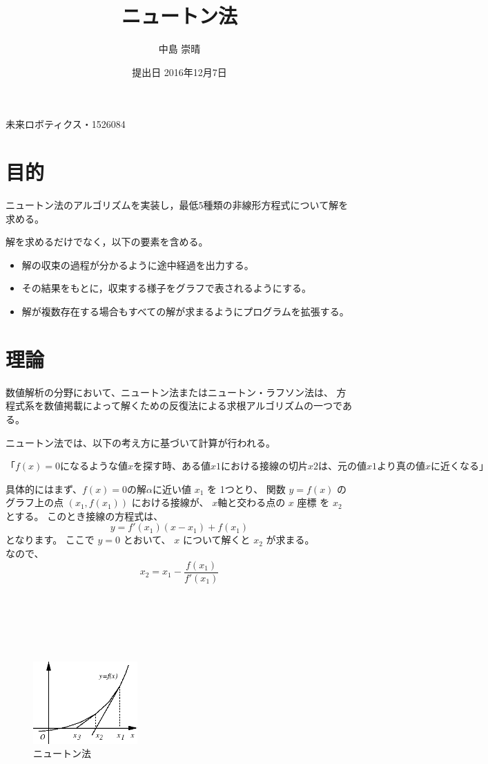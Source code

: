 \documentclass{jsarticle}
\begin{document}
\title{ニュートン法}
\author{中島 崇晴}
\date{提出日 2016年12月7日}
\maketitle
\begin{flushright}
    {\large 未来ロボティクス・1526084}\\
\end{flushright}

\section{目的}
ニュートン法のアルゴリズムを実装し，最低5種類の非線形方程式について解を求める。

解を求めるだけでなく，以下の要素を含める。
\begin{itemize}
    \item 解の収束の過程が分かるように途中経過を出力する。
    \item その結果をもとに，収束する様子をグラフで表されるようにする。
    \item 解が複数存在する場合もすべての解が求まるようにプログラムを拡張する。
\end{itemize}

\section{理論}
数値解析の分野において、ニュートン法またはニュートン・ラフソン法は、
方程式系を数値掲載によって解くための反復法による求根アルゴリズムの一つである。

ニュートン法では、以下の考え方に基づいて計算が行われる。

$「f(x) = 0になるような値xを探す時、ある値x1における接線の切片x2は、元の値x1より真の値xに近くなる」$

具体的にはまず、$f(x)=0$の解$\alpha$に近い値 $x_1$ を 1つとり、 関数 $y=f(x)$ のグラフ上の点  $(x_{1},f(x_1))$ における接線が、
$x$軸と交わる点の $x$ 座標 を $x_2$ とする。 このとき接線の方程式は、
\begin{equation}
    y = f'(x_1)(x-x_1)+f(x_1)
\end{equation}
となります。 ここで $y=0$ とおいて、 $x$ について解くと $x_2$ が求まる。 \\
なので、
\begin{equation}
    x_2=x_1-\frac{f(x_1)}{f'(x_1)}
\end{equation}
\\
\\
\\
\\
\\
\begin{figure}
    \centering
    \includegraphics[bb=0 0 272 214, width=4cm]{img42.png}
    \caption{ニュートン法}
\end{figure}
\end{document}
